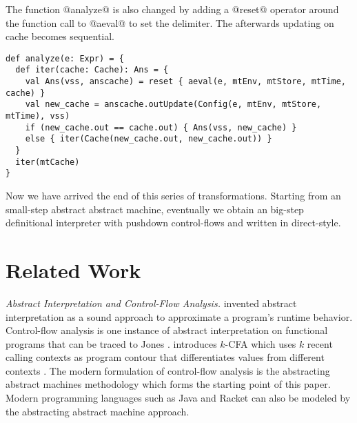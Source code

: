 \documentclass[acmsmall]{acmart}\settopmatter{}
\begin{document}
The function @analyze@ is also changed by adding a @reset@ operator around the function 
call to @aeval@ to set the delimiter. The afterwards updating on cache becomes sequential.

\begin{lstlisting}
def analyze(e: Expr) = {
  def iter(cache: Cache): Ans = {
    val Ans(vss, anscache) = reset { aeval(e, mtEnv, mtStore, mtTime, cache) }
    val new_cache = anscache.outUpdate(Config(e, mtEnv, mtStore, mtTime), vss)
    if (new_cache.out == cache.out) { Ans(vss, new_cache) }
    else { iter(Cache(new_cache.out, new_cache.out)) }
  }
  iter(mtCache)
}
\end{lstlisting}

Now we have arrived the end of this series of transformations. Starting from an 
small-step abstract abstract machine,  eventually we obtain an big-step definitional
interpreter with pushdown control-flows and written in direct-style.


\section{Related Work}\label{sec:related}

\textit{Abstract Interpretation and Control-Flow Analysis.}
\citeauthor{cousot1977abstract} invented abstract interpretation as a sound approach
to approximate a program's runtime behavior\cite{cousot1977abstract}.
Control-flow analysis is one instance of abstract interpretation on functional programs
that can be traced to Jones \cite{jones1981flow}.
\citeauthor{Shivers:1988:CFA:53990.54007} introduces $k$-CFA which uses $k$ recent calling
contexts as program contour that differentiates values from different contexts 
\cite{Shivers:1988:CFA:53990.54007, Shivers:1991:SSC:115865.115884}.
The modern formulation of control-flow analysis is the abstracting abstract machines
methodology \cite{van2012systematic, van2010abstracting} which forms the starting point
of this paper.
Modern programming languages such as Java\cite{might2010resolving} and Racket 
\cite{Tobin-Hochstadt:2012:HSE:2384616.2384655}
can also be modeled by the abstracting abstract machine approach. \\
\end{document}
